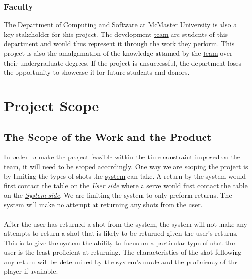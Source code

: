 \documentclass[11pt]{article}
\begin{document}
\subsubsection{Faculty}
The Department of Computing and Software at McMaster University is also a key stakeholder for this project. The development \hyperref[sec:definitions]{team} are students of this department and would thus represent it through the work they perform. This project is also the amalgamation of the knowledge attained by the \hyperref[sec:definitions]{team} over their undergraduate degrees. If the project is unsuccessful, the department loses the opportunity to showcase it for future students and donors.

\section{Project Scope}
\subsection{The Scope of the Work and the Product}
In order to make the project feasible within the time constraint imposed on the \hyperref[sec:definitions]{team}, it will need to be scoped accordingly. One way we are scoping the project is by limiting the types of shots the \hyperref[sec:definitions]{system} can take. A return by the system would first contact the table on the \hyperref[sec:definitions]{\textit{User side}} where a serve would first contact the table on the \hyperref[sec:definitions]{\textit{System side}}. We are limiting the system to only preform returns. The system will make no attempt at returning any shots from the user. \\\\
After the user has returned a shot from the system, the system will not make any attempts to return a shot that is likely to be returned given the user's returns. This is to give the system the ability to focus on a particular type of shot the user is the least proficient at returning. The characteristics of the shot following any return will be determined by the system's mode and the proficiency of the player if available.
\end{document}
